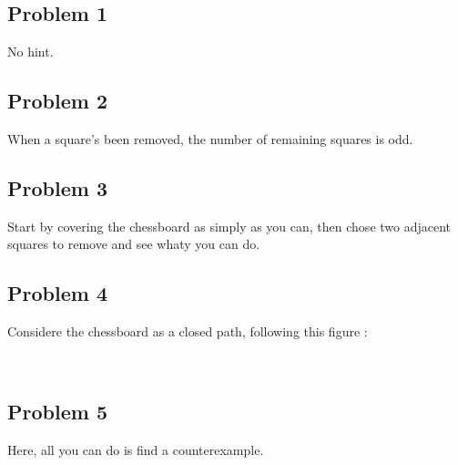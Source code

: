 \documentclass[12pt,a4paper,article,english,firamath]{nsi}
\begin{document}
\subsection*{Problem 1}

No hint.\\[4em]

\subsection*{Problem 2}

When a square's been removed, the number of remaining squares is odd.\\[4em]

\subsection*{Problem 3}

Start by covering the chessboard as simply as you can, then chose two adjacent squares to remove and see whaty you can do.\\[4em]

\subsection*{Problem 4}

Considere the chessboard as a closed path, following this figure :
\begin{center}
\\[4em]
\end{center}

\subsection*{Problem 5}

Here, all you can do is find a counterexample.\\[4em]
\end{document}

